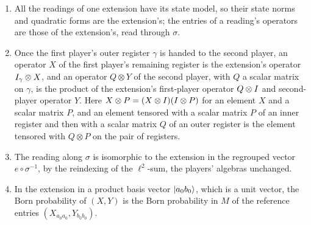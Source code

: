\begin{lemma}
\label{lem:model-reading}
\leanok
\begin{enumerate}
  \item All the readings of one extension have its state model, so their state norms and quadratic
    forms are the extension's; the entries of a reading's operators are those of the extension's,
    read through $\sigma$.
  \item Once the first player's outer register $\gamma$ is handed to the second player, an operator
    $X$ of the first player's remaining register is the extension's operator $I_\gamma \otimes X$,
    and an operator $Q \otimes Y$ of the second player, with $Q$ a scalar matrix on $\gamma$, is the
    product of the extension's first-player operator $Q \otimes I$ and second-player operator $Y$.
    Here $X \otimes P = (X \otimes I)(I \otimes P)$ for an element $X$ and a scalar matrix $P$,
    and an element tensored with a scalar matrix $P$ of an inner register and then with a scalar
    matrix $Q$ of an outer register is the element tensored with $Q \otimes P$ on the pair of
    registers.
  \item The reading along $\sigma$ is isomorphic to the extension in the regrouped vector
    $e \circ \sigma^{-1}$, by the reindexing of the $\ell^2$-sum, the players' algebras unchanged.
  \item In the extension in a product basis vector $|a_0 b_0\rangle$, which is a unit vector, the Born
    probability of $(X, Y)$ is the Born probability in $M$ of the reference entries
    $(X_{a_0 a_0}, Y_{b_0 b_0})$.
\end{enumerate}
\end{lemma}

